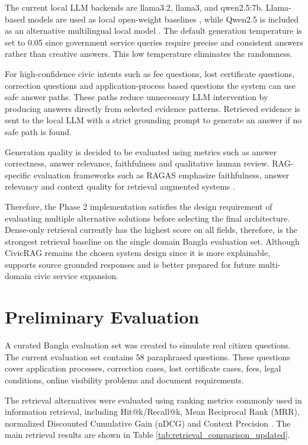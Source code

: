 \documentclass[12pt,oneside,openany]{report}
\begin{document}
The current local LLM backends are llama3.2, llama3, and qwen2.5:7b. Llama-based models are used as local open-weight baselines \cite{dubey2024llama3}, while Qwen2.5 is included as an alternative multilingual local model \cite{qwen2025qwen25}. The default generation temperature is set to 0.05 since government service queries require precise and consistent answers rather than creative answers. This low temperature eliminates the randomness.

For high-confidence civic intents such as fee questions, lost certificate questions, correction questions and application-process based questions the system can use safe answer paths. These paths reduce unnecessary LLM intervention by producing answers directly from selected evidence patterns. Retrieved evidence is sent to the local LLM with a strict grounding prompt to generate an answer if no safe path is found.

Generation quality is decided to be evaluated using metrics such as answer correctness, answer relevance, faithfulness and qualitative human review. RAG-specific evaluation frameworks such as RAGAS emphasize faithfulness, answer relevancy and context quality for retrieval augmented systems \cite{es2024ragas}.

Therefore, the Phase 2 implementation satisfies the design requirement of evaluating multiple alternative solutions before selecting the final architecture. Dense-only retrieval currently has the highest score on all fields, therefore, is the strongest retrieval baseline on the single domain Bangla evaluation set. Although CivicRAG remains the chosen system design since it is more explainable, supports source grounded responses and is better prepared for future multi-domain civic service expansion.

\section{Preliminary Evaluation}

A curated Bangla evaluation set was created to simulate real citizen questions. The current evaluation set contains 58 paraphrased questions. These questions cover application processes, correction cases, lost certificate cases, fees, legal conditions, online visibility problems and document requirements.

The retrieval alternatives were evaluated using ranking metrics commonly used in information retrieval, including Hit@k/Recall@k, Mean Reciprocal Rank (MRR), normalized Discounted Cumulative Gain (nDCG) and Context Precision \cite{manning2008ir,voorhees1999trec8qa,jarvelin2002ndcg}. The main retrieval results are shown in Table \ref{tab:retrieval_comparison_updated}.
\end{document}
